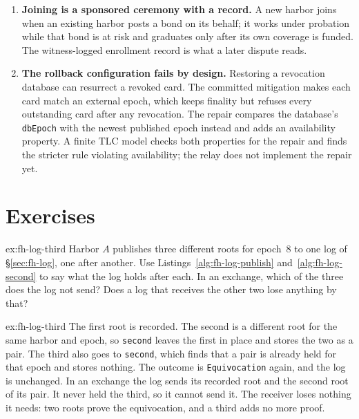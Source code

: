 \documentclass[11pt,a4paper]{article}
\theoremstyle{definition}
\theoremstyle{remark}
\begin{document}
\begin{enumerate}[leftmargin=1.6em,itemsep=2pt]
\item \textbf{Joining is a sponsored ceremony with a record.} A new harbor joins when an existing harbor posts a bond on its behalf; it works under probation while that bond is at risk and graduates only after its own coverage is funded. The witness-logged enrollment record is what a later dispute reads.
\item \textbf{The rollback configuration fails by design.} Restoring a revocation database can resurrect a revoked card. The committed mitigation makes each card match an external epoch, which keeps finality but refuses every outstanding card after any revocation. The repair compares the database's \texttt{dbEpoch} with the newest published epoch instead and adds an availability property. A finite TLC model checks both properties for the repair and finds the stricter rule violating availability; the relay does not implement the repair yet.
\end{enumerate}

\section{Exercises}
\label{sec:fh-exercises}


\begin{pdexercise}[kind=Check,rating=1]{ex:fh-log-third}
Harbor $A$ publishes three different roots for epoch~8 to one log of
\S\ref{sec:fh-log}, one after another. Use
Listings~\ref{alg:fh-log-publish} and~\ref{alg:fh-log-second} to say what
the log holds after each. In an exchange, which of the three does the log
not send? Does a log that receives the other two lose anything by that?
\end{pdexercise}
\begin{pdsolution}{ex:fh-log-third}
The first root is recorded. The second is a different root for the same
harbor and epoch, so \texttt{second} leaves the first in place and stores
the two as a pair. The third also goes to \texttt{second}, which finds
that a pair is already held for that epoch and stores nothing. The
outcome is \texttt{Equivocation} again, and the log is unchanged. In an
exchange the log sends its recorded root and the second root of its pair.
It never held the third, so it cannot send it. The receiver loses nothing
it needs: two roots prove the equivocation, and a third adds no more
proof.
\end{pdsolution}
\end{document}
